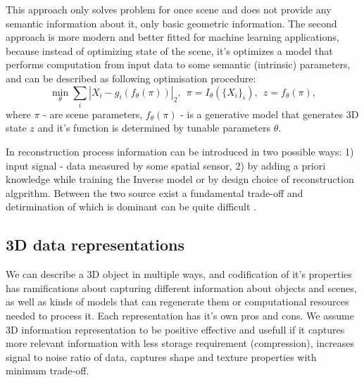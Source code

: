 This approach only solves problem for once scene and does not provide any semantic information about it, only basic geometric information. 
The second approach is more modern and better fitted for machine learning applications, because instead of optimizing state of the scene, it's optimizes a model that performs computation from input data to some semantic (intrinsic) parameters, and can be described as following optimisation procedure:
\begin{equation}
\min_\theta\sum_i|X_i-g_i(f_\theta(\pi))|_2,\ \ \pi=I_\theta(\{X_i\}_i),\ \ z=f_\theta(\pi),
\end{equation}
where $\pi$ - are scene parameters, $f_\theta(\pi)$ - is a generative model that generates 3D state $z$ and it's function is determined by tunable parameters $\theta$.

In reconstruction process information can be introduced in two possible ways: 1) input signal - data measured by some spatial sensor, 2) by adding a priori knowledge while training the Inverse model or by design choice of reconstruction algprithm. Between the two source exist a fundamental trade-off and detirmination of which is dominant can be quite difficult \cite{tatarchenko2019single}.

\subsection{3D data representations}

We can describe a 3D object in multiple ways, and codification of it's properties has ramifications about capturing different information about objects and scenes, as well as kinds of models that can regenerate them or computational resources needed to process it.
Each representation has it's own pros and cons. We assume 3D information representation to be positive effective and usefull if it captures more relevant information with less storage requirement (compression), increases signal to noise ratio of data, captures shape and texture properties with minimum trade-off.

